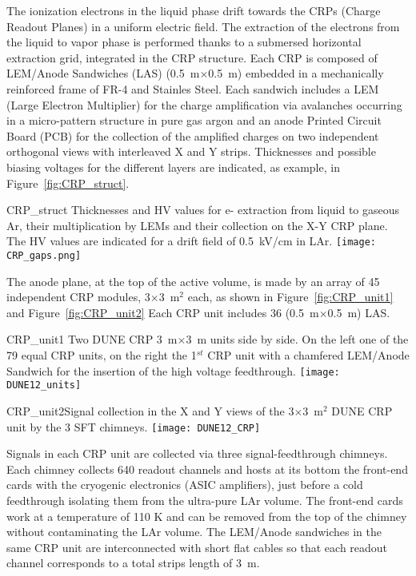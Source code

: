 The ionization electrons in the liquid phase drift towards the CRPs
(Charge Readout Planes) in a uniform electric field. The extraction of
the electrons from the liquid to vapor phase is performed thanks to a
submersed horizontal extraction grid, integrated in the CRP structure.
Each CRP is composed of LEM/Anode Sandwiches (LAS)
(0.5~m$\times$0.5~m) embedded in a mechanically reinforced frame of
FR-4 and Stainles Steel.  Each sandwich includes a LEM (Large Electron
Multiplier) for the charge amplification via avalanches occurring in a
micro-pattern structure in pure gas argon and an anode Printed Circuit
Board (PCB) for the collection of the amplified charges on two
independent orthogonal views with interleaved X and Y strips.
Thicknesses and possible biasing voltages for the different layers are
indicated, as example, in Figure~\ref{fig:CRP_struct}.
\begin{cdrfigure}{CRP_struct}
{Thicknesses and HV values for e- extraction from liquid to gaseous Ar, their 
multiplication by LEMs and their collection on the X-Y CRP plane. The 
HV values are indicated for a drift field of 0.5~kV/cm in LAr.}
\texttt{[image: CRP\_gaps.png]}
\end{cdrfigure}

The anode plane, at the top of the active volume, is made by an array
of 45 independent CRP modules, 3$\times$3~m$^2$ each, as shown in
Figure~\ref{fig:CRP_unit1} and Figure~\ref{fig:CRP_unit2} Each CRP
unit includes 36 (0.5~m$\times$0.5~m) LAS.
\begin{cdrfigure}{CRP_unit1} {Two DUNE CRP 3~m$\times$3~m units side by side. On the left one of the 79 equal 
CRP units, on the right the 1$^{st}$ CRP unit with a chamfered LEM/Anode Sandwich  for the insertion of the high voltage feedthrough.}
\texttt{[image: DUNE12\_units]}
\end{cdrfigure}
\begin{cdrfigure}
{CRP_unit2}{Signal collection in the X and Y views of the  3$\times$3~m$^2$ DUNE CRP unit by the 3 SFT chimneys.}
\texttt{[image: DUNE12\_CRP]}
\end{cdrfigure}


Signals in each CRP unit are collected via three signal-feedthrough
chimneys. Each chimney collects 640 readout channels and hosts at its
bottom the front-end cards with the cryogenic electronics (ASIC
amplifiers), just before a cold feedthrough isolating them from the
ultra-pure LAr volume. The front-end cards work at a temperature of
110 K and can be removed from the top of the chimney without
contaminating the LAr volume. The LEM/Anode sandwiches in the same CRP
unit are interconnected with short flat cables so that each readout
channel corresponds to a total strips length of 3~m.
  
